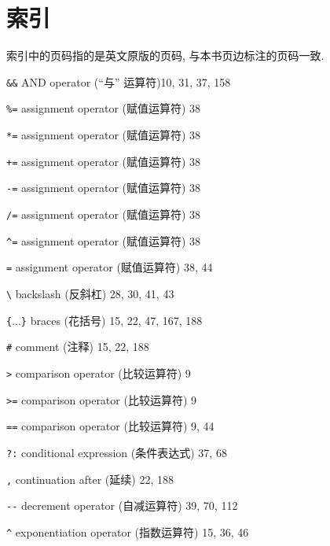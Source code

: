 \chapter{索引}
\label{chap:index}

索引中的页码指的是英文原版的页码, 与本书页边标注的页码一致.

\begin{multicols}{2}
\linespread{1.0}
\setlength\parindent{0pt}
\small
\hangindent=2pc  \verb'&&' AND operator (``与'' 运算符)10, 31, 37, 158

\hangindent=2pc  \verb'%=' assignment operator (赋值运算符) 38

\hangindent=2pc  \verb'*=' assignment operator (赋值运算符) 38

\hangindent=2pc  \verb'+=' assignment operator (赋值运算符) 38

\hangindent=2pc  \verb'-=' assignment operator (赋值运算符) 38

\hangindent=2pc  \verb'/=' assignment operator (赋值运算符) 38

\hangindent=2pc  \verb'^=' assignment operator (赋值运算符) 38

\hangindent=2pc  \verb'=' assignment operator (赋值运算符) 38, 44

\hangindent=2pc  \verb'\' backslash (反斜杠) 28, 30, 41, 43

\hangindent=2pc  \verb'{'...\verb'}' braces (花括号) 15, 22, 47, 167, 188

\hangindent=2pc  \verb'#' comment (注释) 15, 22, 188

\hangindent=2pc  \verb'>' comparison operator (比较运算符) 9

\hangindent=2pc  \verb'>=' comparison operator (比较运算符) 9

\hangindent=2pc  \verb'==' comparison operator (比较运算符) 9, 44

\hangindent=2pc  \verb'?:' conditional expression (条件表达式) 37, 68

\hangindent=2pc  \verb',' continuation after (延续) 22, 188

\hangindent=2pc  \verb'--' decrement operator (自减运算符) 39, 70, 112

\hangindent=2pc  \verb'^' exponentiation operator (指数运算符) 15, 36, 46


\end{multicols}
